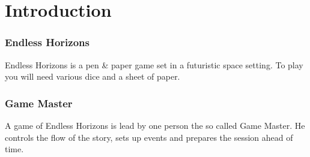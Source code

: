\chapter{Introduction}

\subsection{Endless Horizons}

Endless Horizons is a pen \& paper game set in a futuristic space setting. To
play you will need various dice and a sheet of paper.

\subsection{Game Master}

A game of Endless Horizons is lead by one person the so called Game Master.
He controls the flow of the story, sets up events and prepares the
session ahead of time.
